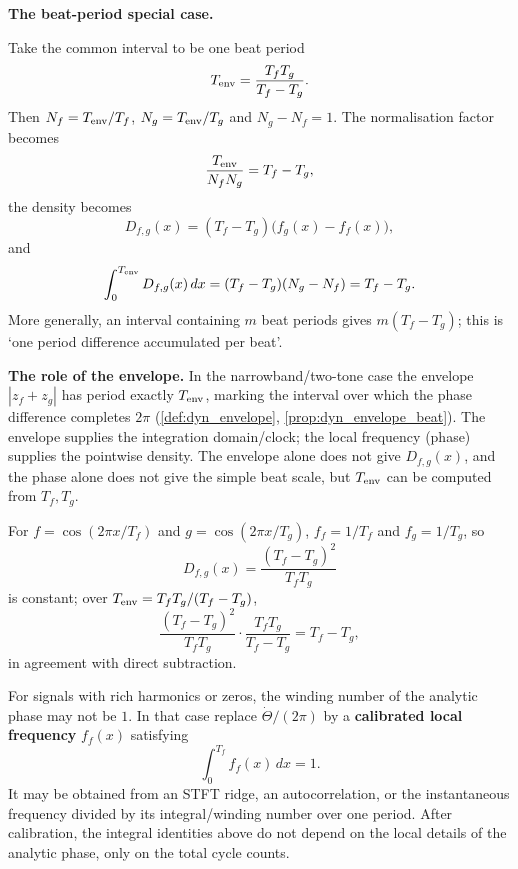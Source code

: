 \textbf{The beat-period special case.}

Take the common interval to be one beat period
\[
T_{\rm env}=\frac{T_fT_g}{T_f-T_g}.
\]
Then \(N_f=T_{\rm env}/T_f\), \(N_g=T_{\rm env}/T_g\) and \(N_g-N_f=1\). The normalisation factor becomes
\[
\frac{T_{\rm env}}{N_fN_g}=T_f-T_g,
\]
the density becomes
\[
D_{f,g}(x)=(T_f-T_g)\bigl(f_g(x)-f_f(x)\bigr),
\]
and
\[
\int_0^{T_{\rm env}}D_{f,g}(x)\,dx
=(T_f-T_g)(N_g-N_f)=T_f-T_g.
\]
More generally, an interval containing \(m\) beat periods gives \(m(T_f-T_g)\); this is `one period difference accumulated per beat'.

\textbf{The role of the envelope.} In the narrowband/two-tone case the envelope \(|z_f+z_g|\) has period exactly \(T_{\rm env}\), marking the interval over which the phase difference completes \(2\pi\) (\cref{def:dyn_envelope}, \cref{prop:dyn_envelope_beat}). The envelope supplies the integration domain/clock; the local frequency (phase) supplies the pointwise density. The envelope alone does not give \(D_{f,g}(x)\), and the phase alone does not give the simple beat scale, but \(T_{\rm env}\) can be computed from \(T_f,T_g\).

\begin{example}
\label{ex:dyn_period_difference_pure_tone}
For \(f=\cos(2\pi x/T_f)\) and \(g=\cos(2\pi x/T_g)\), \(f_f=1/T_f\) and \(f_g=1/T_g\), so
\[
D_{f,g}(x)=\frac{(T_f-T_g)^2}{T_fT_g}
\]
is constant; over \(T_{\rm env}=T_fT_g/(T_f-T_g)\),
\[
\frac{(T_f-T_g)^2}{T_fT_g}\cdot\frac{T_fT_g}{T_f-T_g}=T_f-T_g,
\]
in agreement with direct subtraction.
\end{example}

\begin{remark}
\label{rem:dyn_period_density_calibration}
For signals with rich harmonics or zeros, the winding number of the analytic phase may not be \(1\). In that case replace \(\dot\Theta/(2\pi)\) by a \textbf{calibrated local frequency} \(f_f(x)\) satisfying
\[
\int_0^{T_f} f_f(x)\,dx=1.
\]
It may be obtained from an STFT ridge, an autocorrelation, or the instantaneous frequency divided by its integral/winding number over one period. After calibration, the integral identities above do not depend on the local details of the analytic phase, only on the total cycle counts.
\end{remark}


